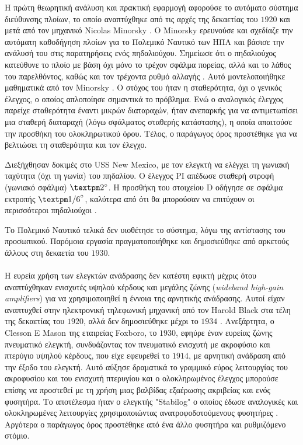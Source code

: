 Η πρώτη θεωρητική ανάλυση και πρακτική εφαρμογή αφορούσε το αυτόματο σύστημα διεύθυνσης πλοίων, το οποίο αναπτύχθηκε από τις αρχές της δεκαετίας του $1920$ και μετά από τον μηχανικό Nicolas Minorsky \cite{origin8}. Ο Minorsky ερευνούσε και σχεδίαζε την αυτόματη καθοδήγηση πλοίων για το Πολεμικό Ναυτικό των ΗΠΑ και βάσισε την ανάλυσή του στις παρατηρήσεις ενός πηδαλιούχου. Σημείωσε ότι ο πηδαλιούχος κατεύθυνε το πλοίο με βάση όχι μόνο το τρέχον σφάλμα πορείας, αλλά και το λάθος του παρελθόντος, καθώς και τον τρέχοντα ρυθμό αλλαγής \cite{origin9}. Αυτό μοντελοποιήθηκε μαθηματικά από τον Minorsky \cite{origin3}. Ο στόχος του ήταν η σταθερότητα, όχι ο γενικός έλεγχος, ο οποίος απλοποίησε σημαντικά το πρόβλημα. Ενώ ο αναλογικός έλεγχος παρείχε σταθερότητα έναντι μικρών διαταραχών, ήταν ανεπαρκής για να αντιμετωπίσει μια σταθερή διαταραχή (λόγω σφάλματος σταθερής κατάστασης), η οποία απαιτούσε την προσθήκη του ολοκληρωτικού όρου. Τέλος, ο παράγωγος όρος προστέθηκε για να βελτιώσει τη σταθερότητα και τον έλεγχο.

Διεξήχθησαν δοκιμές στο USS New Mexico, με τον ελεγκτή να ελέγχει τη γωνιακή ταχύτητα (όχι τη γωνία) του πηδαλίου. Ο έλεγχος PI απέδωσε σταθερή στροφή (γωνιακό σφάλμα) $±2\degree$. Η προσθήκη του στοιχείου D οδήγησε σε σφάλμα εκτροπής $±{1/6}\degree$, καλύτερα από ότι θα μπορούσαν να επιτύχουν οι περισσότεροι πηδαλιούχοι \cite{origin10}.

Το Πολεμικό Ναυτικό τελικά δεν υιοθέτησε το σύστημα, λόγω της αντίστασης του προσωπικού. Παρόμοια εργασία πραγματοποιήθηκε και δημοσιεύθηκε από αρκετούς άλλους στη δεκαετία του $1930$.

\paragraph{}Η ευρεία χρήση των ελεγκτών ανάδρασης δεν κατέστη εφικτή μέχρις ότου αναπτύχθηκαν ενισχυτές υψηλού κέρδους και μεγάλης ζώνης (\emph{wideband high-gain amplifiers}) για να χρησιμοποιηθεί η έννοια της αρνητικής ανάδρασης. Αυτοί είχαν αναπτυχθεί στην ηλεκτρονική τηλεφωνική μηχανική από τον Harold Black στα τέλη της δεκαετίας του $1920$, αλλά δεν δημοσιεύθηκε μέχρι το $1934$ \cite{origin3}. Ανεξάρτητα, ο Clesson E Mason της εταιρείας Foxboro, το $1930$, εφηύρε έναν ευρείας ζώνης πνευματικό ελεγκτή, συνδυάζοντας τον πνευματικό ενισχυτή με ακροφύσιο και πτερύγιο υψηλού κέρδους, που είχε εφευρεθεί το $1914$, με αρνητική ανάδραση από την έξοδο του ελεγκτή. Αυτό αύξησε δραματικά το γραμμικό εύρος λειτουργίας του ακροφυσίου και του ενισχυτή πτερυγίου και ο ολοκληρωμένος έλεγχος μπορούσε επίσης να προστεθεί με τη χρήση μιας βαλβίδας εξαέρωσης ακριβείας και ενός φυσητήρα. Το αποτέλεσμα ήταν ο ελεγκτής "Stabilog" ο οποίος έδωσε αναλογικές και ολοκληρωμένες λειτουργίες χρησιμοποιώντας ανατροφοδοτούμενους φυσητήρες \cite{origin3}. Αργότερα ο παράγωγος όρος προστέθηκε από ένα άλλο φυσητήρα και ρυθμιζόμενο στόμιο.

